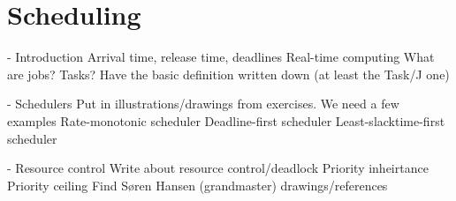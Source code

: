 \section{Scheduling} \label{sc:scheduling}

- Introduction
Arrival time, release time, deadlines
Real-time computing
What are jobs? Tasks?
Have the basic definition written down (at least the Task/J one)

- Schedulers
Put in illustrations/drawings from exercises. We need a few examples
Rate-monotonic scheduler
Deadline-first scheduler
Least-slacktime-first scheduler

- Resource control
Write about resource control/deadlock
Priority inheirtance
Priority ceiling
Find Søren Hansen (grandmaster) drawings/references